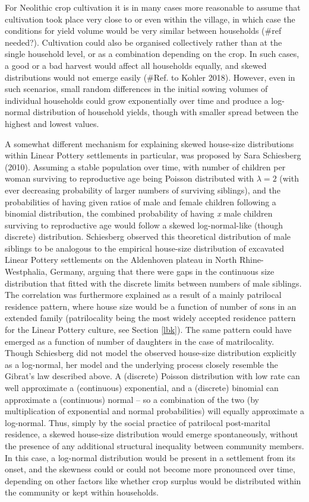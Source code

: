 \documentclass[
  12pt,
]{book}
\begin{document}
For Neolithic crop cultivation it is in many cases more reasonable to assume that cultivation took place very close to or even within the village, in which case the conditions for yield volume would be very similar between households (\#ref needed?). Cultivation could also be organised collectively rather than at the single household level, or as a combination depending on the crop. In such cases, a good or a bad harvest would affect all households equally, and skewed distributions would not emerge easily (\#Ref. to Kohler 2018). However, even in such scenarios, small random differences in the initial sowing volumes of individual households could grow exponentially over time and produce a log-normal distribution of household yields, though with smaller spread between the highest and lowest values.

A somewhat different mechanism for explaining skewed house-size distributions within Linear Pottery settlements in particular, was proposed by Sara Schiesberg (2010). Assuming a stable population over time, with number of children per woman surviving to reproductive age being Poisson distributed with \(\lambda = 2\) (with ever decreasing probability of larger numbers of surviving siblings), and the probabilities of having given ratios of male and female children following a binomial distribution, the combined probability of having \emph{x} male children surviving to reproductive age would follow a skewed log-normal-like (though discrete) distribution. Schiesberg observed this theoretical distribution of male siblings to be analogous to the empirical house-size distribution of excavated Linear Pottery settlements on the Aldenhoven plateau in North Rhine-Westphalia, Germany, arguing that there were gaps in the continuous size distribution that fitted with the discrete limits between numbers of male siblings. The correlation was furthermore explained as a result of a mainly patrilocal residence pattern, where house size would be a function of number of sons in an extended family (patrilocality being the most widely accepted residence pattern for the Linear Pottery culture, see Section \ref{lbk}). The same pattern could have emerged as a function of number of daughters in the case of matrilocality. Though Schiesberg did not model the observed house-size distribution explicitly as a log-normal, her model and the underlying process closely resemble the Gibrat's law described above. A (discrete) Poisson distribution with low rate can well approximate a (continuous) exponential, and a (discrete) binomial can approximate a (continuous) normal -- so a combination of the two (by multiplication of exponential and normal probabilities) will equally approximate a log-normal. Thus, simply by the social practice of patrilocal post-marital residence, a skewed house-size distribution would emerge spontaneously, without the presence of any additional structural inequality between community members. In this case, a log-normal distribution would be present in a settlement from its onset, and the skewness could or could not become more pronounced over time, depending on other factors like whether crop surplus would be distributed within the community or kept within households.
\end{document}
